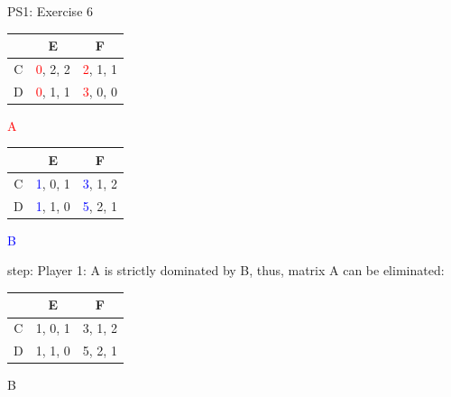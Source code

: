 \begin{frame}{PS1: Exercise 6}
\begin{multicols}{2}
\begin{table}
  \begin{tabular}{c|c|c}
      & E       & F       \\
    \midrule
    C & \textcolor{red}{0}, 2, 2 & \textcolor{red}{2}, 1, 1 \\
    \midrule
    D & \textcolor{red}{0}, 1, 1 & \textcolor{red}{3}, 0, 0
  \end{tabular}
  \center \textcolor{red}{A}
\end{table}
\columnbreak
\begin{table}
  \begin{tabular}{c|c|c}
      & E       & F       \\
    \midrule
    C & \textcolor{blue}{1}, 0, 1 & \textcolor{blue}{3}, 1, 2 \\
    \midrule
    D & \textcolor{blue}{1}, 1, 0 & \textcolor{blue}{5}, 2, 1
  \end{tabular}
  \center \textcolor{blue}{B}
\end{table}
\end{multicols}
 step: Player 1: A is strictly dominated by B, thus, matrix A can be eliminated:
\begin{multicols}{2}
\vfill\null
\columnbreak
\begin{table}
  \begin{tabular}{c|c|c}
      & E       & F       \\
    \midrule
    C & 1, 0, 1 & 3, 1, 2 \\
    \midrule
    D & 1, 1, 0 & 5, 2, 1
  \end{tabular}
  \center B
\end{table}
\vfill\null
\end{multicols}
\end{frame}

